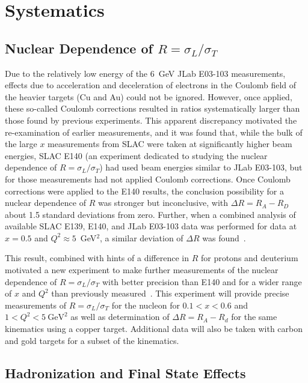 \section{Systematics}
\subsection{Nuclear Dependence of $R=\sigma_L/\sigma_T$}


Due to the relatively low energy of the 6~GeV JLab E03-103 measurements, effects due to acceleration and
deceleration of electrons in the Coulomb field of the heavier targets (Cu and Au) could not be ignored.
However, once applied, these so-called Coulomb corrections resulted in ratios systematically larger
than those found by previous experiments.  This apparent discrepancy motivated the re-examination of
earlier measurements, and it was found that, while the bulk of the large $x$ measurements from SLAC
were taken at significantly higher beam energies, SLAC E140 (an experiment dedicated to studying
the nuclear dependence of $R=\sigma_L/\sigma_T$) had used beam energies similar to JLab E03-103, but for
those measurements had not applied Coulomb corrections.  Once Coulomb corrections were applied to the E140
results, the conclusion possibility for a nuclear dependence of $R$ was stronger but inconclusive, with
$\Delta R=R_A-R_D$ about 1.5 standard deviations from zero. Further, when a combined analysis
of available SLAC E139, E140, and JLab E03-103 data was performed for data at $x=0.5$ and $Q^2\approx5$~GeV$^2$,
a similar deviation of $\Delta R$ was found~\cite{Solvignon:2009it}.

This result, combined with hints of a difference in $R$ for protons and deuterium motivated a 
new experiment to make further measurements of the nuclear dependence of $R=\sigma_L/\sigma_T$
with better precision than E140 and for a wider range of $x$ and $Q^2$ than previously
measured~\cite{12gev_nucr}.  This experiment will provide precise measurements of $R=\sigma_L/\sigma_T$
for the nucleon for $0.1<x<0.6$ and $1<Q^2<5~\text{GeV}^2$ as well as determination of $\Delta R= R_A-R_d$ for the same
kinematics using a copper target. Additional data will also be taken with carbon and gold targets for a subset
of the kinematics.


\subsection{Hadronization and Final State Effects}


